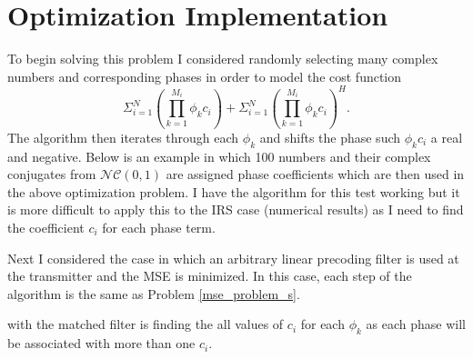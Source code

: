 \documentclass[12pt,a4paper]{report}
\begin{document}
\section{Optimization Implementation}
To begin solving this problem I considered randomly selecting many complex numbers and corresponding phases in order to model the cost function 
	\begin{equation}
	\Sigma_{i=1}^{N} \left(\prod_{k=1}^{M_i}\phi_{k} c_i \right ) +  \Sigma_{i=1}^{N} \left(\prod_{k=1}^{M_i}\phi_{k} c_i \right)^H.
	\end{equation}
	The algorithm then iterates through each $\phi_{k}$ and shifts the phase such $\phi_{k} c_i$ a real and negative.
	Below is an example in which 100 numbers and their complex conjugates from $\mathcal{NC}(0,1)$ are assigned phase coefficients which are then used in the above optimization 
	problem. I have the algorithm for this test working but it is more difficult to apply this to the IRS case (numerical results) as I need to find the coefficient $c_i$ for each phase term.
	\par
	Next I considered the case in which an arbitrary linear precoding filter is used at the transmitter and the MSE is minimized.
	In this case, each step of the algorithm is the same as Problem \eqref{mse_problem_s}.
	
	 with the matched filter is finding the all values of $ c_i $ for each $\phi_{k}$ as each phase will be associated with more than one $ c_i $.

\end{document}
